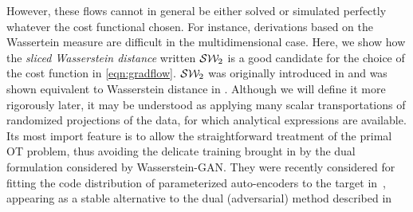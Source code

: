 However, these flows cannot in general be either solved or simulated perfectly whatever the cost functional chosen. For instance, derivations based on the Wassertein measure are difficult in the multidimensional case.  Here, we show how the \textit{sliced Wasserstein distance} written ${\cal S}{\cal W}_2$ is a good candidate for the choice of the cost function in \eqref{eqn:gradflow}. ${\cal S}{\cal W}_2$ was originally introduced in \cite{pitie2005n} and was shown equivalent to Wasserstein distance in \cite{bonnotte2013unidimensional}. Although we will define it more rigorously later, it may be understood as applying many scalar transportations of randomized projections of the data, for which analytical expressions are available. Its most import feature is to allow the straightforward treatment of the primal OT problem, thus avoiding the delicate training brought in by the dual formulation considered by Wasserstein-GAN. They were recently considered for fitting the code distribution of parameterized auto-encoders to the target in~\cite{kolouri2018sliced}, appearing as a stable alternative to the dual (adversarial) method described in~\cite{makhzani2015adversarial}


